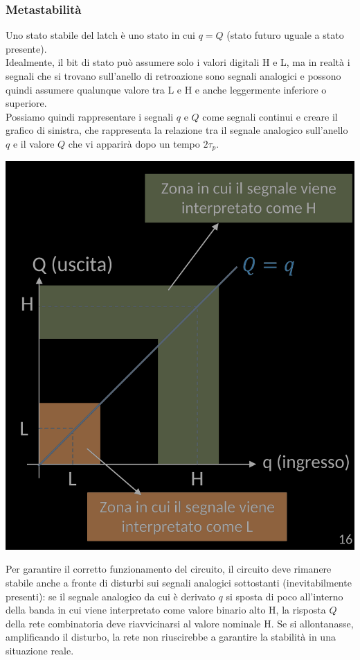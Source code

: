 \documentclass{article}
\begin{document}
\subsubsection{Metastabilità}
Uno stato stabile del latch è uno stato in cui $q=Q$ (stato futuro uguale a stato presente).\\
Idealmente, il bit di stato può assumere solo i valori digitali H e L, ma in realtà i segnali che si trovano sull’anello di retroazione sono segnali analogici e possono quindi assumere qualunque valore tra L e H e anche leggermente inferiore o superiore.\\
Possiamo quindi rappresentare i segnali $q$ e $Q$ come segnali continui e creare il grafico di sinistra, che rappresenta la relazione tra il segnale analogico sull’anello $q$ e il valore $Q$ che vi apparirà dopo un tempo $2 \tau _{p}$.
\begin{center}
    \includegraphics[scale=0.38]{metastabilita1.png}
\end{center}
Per garantire il corretto funzionamento del circuito, il circuito deve rimanere stabile anche a fronte di disturbi sui segnali analogici sottostanti (inevitabilmente presenti): se il segnale analogico da cui è derivato $q$ si sposta di poco all’interno della banda in cui viene interpretato come valore binario alto H, la risposta $Q$ della rete combinatoria deve riavvicinarsi al valore nominale H. Se si allontanasse, amplificando il disturbo, la rete non riuscirebbe a garantire la stabilità in una situazione reale.\\
\end{document}
